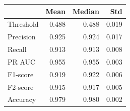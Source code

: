 \begin{tabular}{lrrr}
\toprule
 & Mean & Median & Std \\
\midrule
Threshold & 0.488 & 0.488 & 0.019 \\
Precision & 0.925 & 0.924 & 0.017 \\
Recall & 0.913 & 0.913 & 0.008 \\
PR AUC & 0.955 & 0.955 & 0.003 \\
F1-score & 0.919 & 0.922 & 0.006 \\
F2-score & 0.915 & 0.917 & 0.005 \\
Accuracy & 0.979 & 0.980 & 0.002 \\
\bottomrule
\end{tabular}
